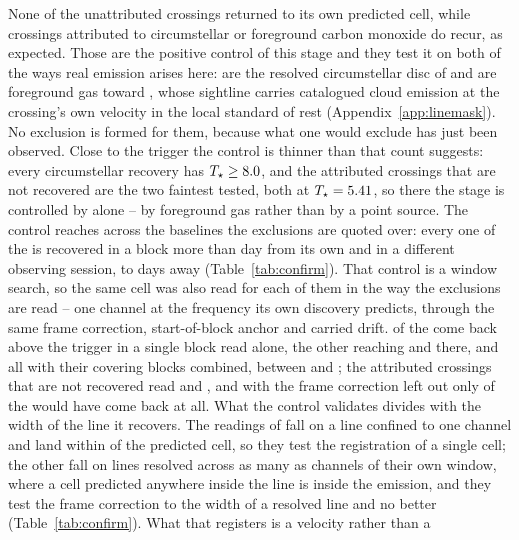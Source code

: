 None of the unattributed crossings returned to its own predicted cell, while
\MkAttrRecur{} crossings attributed to circumstellar or foreground carbon
monoxide do recur, as expected. Those \MkAttrRecur{} are the positive control of this stage and they
test it on both of the ways real emission arises here: \RqNRecurDisc{} are the
resolved circumstellar disc of \RqRecurDiscStars{} and \RqNRecurCloud{} are
foreground gas toward \RqRecurCloudStars, whose sightline carries catalogued
cloud emission at the crossing's own velocity in the local standard of rest
(Appendix~\ref{app:linemask}). No exclusion is formed for them, because what
one would exclude has just been observed. Close to the trigger the control is
thinner than that count suggests: every circumstellar recovery has
$T_\star\ge8.0$, and the \RqNearTrigN{} attributed crossings that
are not recovered are the two faintest tested, both at
$T_\star=5.41$, so there the stage is controlled by
\RqRecurCloudStars{} alone -- by foreground gas rather than by a point
source. The control reaches across the baselines the exclusions are quoted
over: every one of the \QcNCtl{} is recovered in a block more than \EpSep{}
day from its own and in a different observing session, \QcSepMinD{} to
\QcSepMaxD{} days away (Table~\ref{tab:confirm}).
That control is a window search, so the same cell was also read for each of
them in the way the exclusions are read -- one channel at the frequency its
own discovery predicts, through the same frame correction, start-of-block
anchor and carried drift. \RgNCtlSingle{} of the \RgNCtl{} come back above the trigger in a single block
read alone, the other \RgNCtlBelow{} reaching \RgCtlLoOne{} and
\RgCtlLoTwo{} there, and all \RgNCtl{} with their covering blocks combined,
between \LrTrepLo{} and \LrTrepHi; the \LrNAbs{} attributed crossings that are
not recovered read \LrAbsHi{} and \LrAbsLo, and with the frame correction left
out only \LrNoFrameCtl{} of the \LrNCtl{} would have come back at all. What
the control validates divides with the width of the line it recovers. The
\RgRegNUnres{} readings of \RgRegStar{} fall on a line confined to one channel
and land within \RgRegMaxCh{} of the predicted cell, so they test the
registration of a single cell; the other \RgRegNRes{} fall on lines resolved
across as many as \RgResFwhmChMax{} channels of their own window, where a cell
predicted anywhere inside the line is inside the emission, and they test the
frame correction to the width of a resolved line and no better
(Table~\ref{tab:confirm}). What that registers is a velocity rather than a
